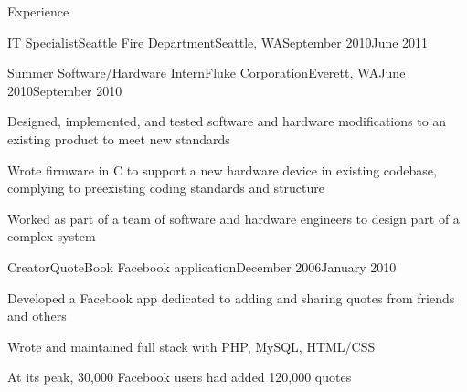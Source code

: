 \documentclass[letterpaper,10pt]{article}
\newcommand{\optarg}[2][]{%
  \ifthenelse{\isempty{#1}}%
    {}%
    {#2}%
}
\newenvironment{res_section}[1]{%
  \vskip 6pt
  \noindent
  {\Large \textbf{#1}}\\
  \rule[8pt]{\textwidth}{0.5pt}
  \vskip -8pt
}{
}
\newenvironment{res_subsection}[1]{%
  \vskip 4pt
  \noindent
  \textbf{\large{#1}}
  \begin{itemize}
}{
  \end{itemize}
}
\newenvironment{res_experienceitem}[5]{%
  \begin{res_subsection}{#1 - \em{%
  #2%
  \optarg[#3]{, #3}%
  \optarg[#4]{, #4}%
  \optarg[#5]{ -- #5}%
  }}
}{
  \end{res_subsection}
}
\begin{document}
\begin{res_section}{Experience}
\begin{res_experienceitem}{IT Specialist}{Seattle Fire Department}{Seattle, WA}{September 2010}{June 2011}
\end{res_experienceitem}
\begin{res_experienceitem}{Summer Software/Hardware Intern}{Fluke Corporation}{Everett, WA}{June 2010}{September 2010}
  \item Designed, implemented, and tested software and hardware modifications to an existing product to meet new standards
  \item Wrote firmware in C to support a new hardware device in existing codebase, complying to preexisting coding standards and structure
  \item Worked as part of a team of software and hardware engineers to design part of a complex system
\end{res_experienceitem}
\begin{res_experienceitem}{Creator}{QuoteBook Facebook application}{}{December 2006}{January 2010}
  \item Developed a Facebook app dedicated to adding and sharing quotes from friends and others
  \item Wrote and maintained full stack with PHP, MySQL, HTML/CSS
  \item At its peak, 30,000 Facebook users had added 120,000 quotes
\end{res_experienceitem}
\end{res_section}
\end{document}
